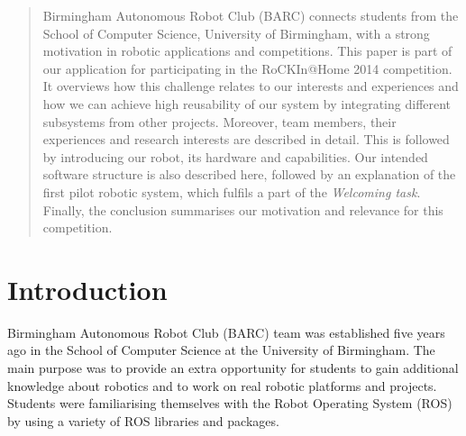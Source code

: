 \documentclass[conference]{IEEEtran}
\begin{document}
\begin{abstract}

Birmingham Autonomous Robot Club (BARC) connects students from the School of Computer Science, University of Birmingham, with a strong motivation in robotic applications and competitions. This paper is part of our application for participating in the RoCKIn@Home 2014 competition. It overviews how this challenge relates to our interests and experiences and how we can achieve high reusability of our system by integrating different subsystems from other projects. Moreover, team members, their experiences and research interests are described in detail. This is followed by introducing our robot, its hardware and capabilities. Our intended software structure is also described here, followed by an explanation of the first pilot robotic system, which fulfils a part of the \textit{Welcoming task}. Finally, the conclusion summarises our motivation and relevance for this competition.


\end{abstract}





%
\IEEEpeerreviewmaketitle



\section{Introduction}

Birmingham Autonomous Robot Club (BARC) team was established five years ago in the School of Computer Science at the University of Birmingham. The main purpose was to provide an extra opportunity for students to gain additional knowledge about robotics and to work on real robotic platforms and projects. Students were familiarising themselves with the Robot Operating System (ROS) by using a variety of ROS libraries and packages.
\end{document}
